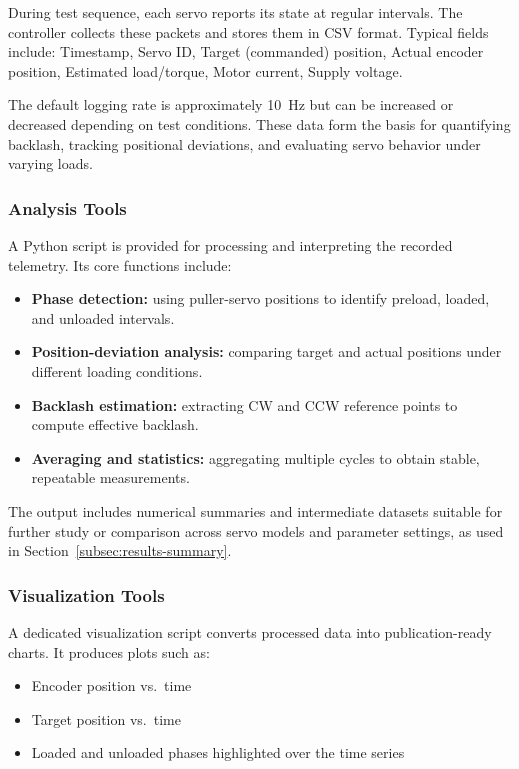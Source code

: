 \documentclass[11pt,letterpaper]{article}
\begin{document}
During test sequence, each servo reports its state at regular intervals. The controller collects these packets and stores them in CSV format. Typical fields include: Timestamp, Servo ID, Target (commanded) position, Actual encoder position, Estimated load/torque, Motor current, Supply voltage.

The default logging rate is approximately 10~Hz but can be increased or decreased depending on test conditions. These data form the basis for quantifying backlash, tracking positional deviations, and evaluating servo behavior under varying loads.

\subsubsection{Analysis Tools}
\label{subsubsec:analysis-tools}

A Python script is provided for processing and interpreting the recorded telemetry. Its core functions include:
\begin{itemize}
    \item \textbf{Phase detection:} using puller-servo positions to identify preload, loaded, and unloaded intervals.
    \item \textbf{Position-deviation analysis:} comparing target and actual positions under different loading conditions.
    \item \textbf{Backlash estimation:} extracting CW and CCW reference points to compute effective backlash.
    \item \textbf{Averaging and statistics:} aggregating multiple cycles to obtain stable, repeatable measurements.
\end{itemize}

The output includes numerical summaries and intermediate datasets suitable for further study or comparison across servo models and parameter settings, as used in Section~\ref{subsec:results-summary}.

\subsubsection{Visualization Tools}
\label{subsubsec:visualization-tools}

A dedicated visualization script converts processed data into publication-ready charts. It produces plots such as:
\begin{itemize}
    \item Encoder position vs.\ time
    \item Target position vs.\ time
    \item Loaded and unloaded phases highlighted over the time series
\end{itemize}
\end{document}
